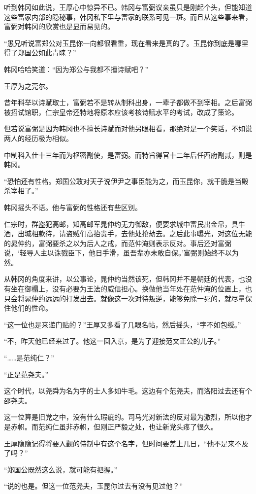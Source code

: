 听到韩冈如此说，王厚心中惊异不已。韩冈与富弼议亲虽只是刚起个头，但能知道这些富家内部的隐秘事，韩冈私下里与富家的联系可见一斑。而且从这些事来看，富弼对韩冈的欣赏也是显而易见的。

“愚兄听说富郑公对玉昆你一向都很看重，现在看来是真的了。玉昆你到底是哪里得了郑国公如此青睐？”

韩冈哈哈笑道：“因为郑公与我都不擅诗赋吧？”

王厚为之莞尔。

昔年科举以诗赋取士，富弼若不是转从制科出身，一辈子都做不到宰相。之后富弼被招试馆职，仁宗皇帝还特地将原本应该考核诗赋水平的考试，改成了策论。

但若说富弼是因为韩冈也不擅长诗赋而对他另眼相看，那绝对是一个笑话，不如说两人的经历极为相似。

中制科入仕十三年而为枢密副使，是富弼。而特旨得官十二年后任西府副贰，则是韩冈。

“恐怕还有性格。郑国公敢对天子说伊尹之事臣能为之，而玉昆你，就干脆是当殿杀宰相了。”

韩冈摇头不语。他与富弼的性格还有些区别。

仁宗时，群盗犯高邮，知高邮军晁仲约无力御敌，便要求城中富民出金帛，具牛酒，出城相款待，请盗贼们高抬贵手，去他处抢劫去。之后此事曝光，对这位无能的晁仲约，富弼要杀之以为后人之戒，而范仲淹则表示反对。事后还对富弼说，‘轻导人主以诛戮臣下，他日手滑，虽吾辈亦未敢自保。’富弼则始终不以为然。

从韩冈的角度来讲，以公事论，晁仲约当然该死，但韩冈并不是朝廷的代表，也没有坐在御榻上，没有必要为王法的威信担心。换做他当年处在范仲淹的位置上，也只会将晁仲约远远的打发出去。就像这一次对待叛逆，能够免除一死的，就尽量保住他们的性命。

“这一位也是来递门贴的？”王厚又多看了几眼名帖，然后摇头，“字不如包绶。”

“不，昨天他已经来过了。他这一回入京，是为了迎接范文正公的儿子。”

“……是范纯仁？”

“正是范尧夫。”

这个时代，以尧舜为名为字的士人多如牛毛。这边有个范尧夫，而洛阳过去还有个邵尧夫。

这一位算是旧党之中，没有什么瑕疵的。司马光对新法的反对最为激烈，所以他才是赤帜。而范纯仁虽非赤帜，但刚正严毅之处，也让新党头疼了很久。

王厚隐隐记得将要入觐的侍制中有这个名字，但时间要差上几日，“他不是来不及了吗？”

“郑国公既然这么说，就可能有把握。”

“说的也是。但这一位范尧夫，玉昆你过去有没有见过他？”

